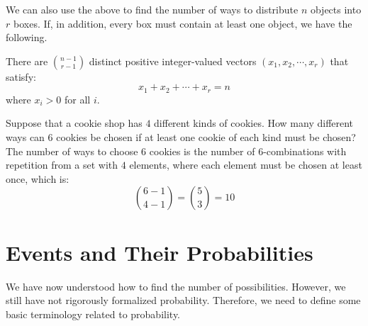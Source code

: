 \documentclass{huhtakm-template-book-v2}
\begin{document}
    We can also use the above to find the number of ways to distribute $n$ objects into $r$ boxes. If, in addition, every box must contain at least one object, we have the following.
    \begin{thm}
        There are $\binom{n-1}{r-1}$ distinct positive integer-valued vectors $(x_{1},x_{2},\cdots,x_{r})$ that satisfy:
        \begin{equation*}
            x_{1}+x_{2}+\cdots+x_{r} = n
        \end{equation*}
        where $x_{i} > 0$ for all $i$.
    \end{thm}
    \begin{eg}
        Suppose that a cookie shop has $4$ different kinds of cookies. How many different ways can $6$ cookies be chosen if at least one cookie of each kind must be chosen? The number of ways to choose $6$ cookies is the number of $6$-combinations with repetition from a set with $4$ elements, where each element must be chosen at least once, which is:
        \begin{equation*}
            \binom{6-1}{4-1} = \binom{5}{3} = 10
        \end{equation*}
    \end{eg}

\chapter{Events and Their Probabilities}
    \label{Chapter 2 (Events and Their Probabilities)}
    We have now understood how to find the number of possibilities. However, we still have not rigorously formalized probability. Therefore, we need to define some basic terminology related to probability.
\end{document}
